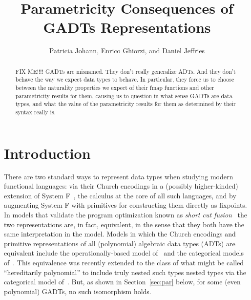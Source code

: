 \documentclass[acmsmall,screen,review,anonymous]{acmart}
\title[Parametricity Consequences of GADTs
  Representations]{Parametricity Consequences of GADTs
  Representations}
\author{Patricia Johann, Enrico Ghiorzi, and Daniel Jeffries}
\affiliation{ \institution{Appalachian State University}}
\theoremstyle{definition}
\begin{document}
\begin{abstract}
FIX ME!!!! GADTs are misnamed. They don't really generalize ADTs. And
they don't behave the way we expect data types to behave. In
particular, they force us to choose between the naturality properties
we expect of their fmap functions and other parametricity results for
them, causing us to question in what sense GADTs are data types, and
what the value of the parametricity results for them as determined by
their syntax really is.
\end{abstract}

\maketitle

\section{Introduction}

There are two standard ways to represent data types when studying
modern functional languages: via their Church encodings in a (possibly
higher-kinded) extension of System F~\cite{gir72}, the calculus at the
core of all such languages, and by augmenting System F
with primitives for constructing them directly as fixpoints.
In models that validate the program optimization known as {\em short
  cut fusion}~\cite{glp93} the two representations are, in fact,
equivalent, in the sense that they both have the same interpretation
in the model. Models in which the Church encodings and primitive
representations of all {\color{blue} (polynomial)} algebraic data
types (ADTs) are equivalent include the operationally-based model
of~\cite{pit98,pit00} and the categorical models
of~\cite{joh02,joh03}.
This equivalence was recently extended to the class of what might be
called ``hereditarily polynomial'' {\color{blue} to include truly
  nested such types} nested types via the categorical model
of~\cite{jgj21}. But, as shown in Section~\ref{sec:par} below, for
some {\color{blue} (even polynomial)} GADTs,
no such isomorphism holds.
\end{document}
